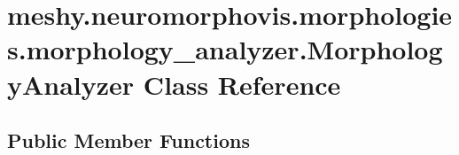 \hypertarget{classmeshy_1_1neuromorphovis_1_1morphologies_1_1morphology__analyzer_1_1MorphologyAnalyzer}{}\section{meshy.\+neuromorphovis.\+morphologies.\+morphology\+\_\+analyzer.\+Morphology\+Analyzer Class Reference}
\label{classmeshy_1_1neuromorphovis_1_1morphologies_1_1morphology__analyzer_1_1MorphologyAnalyzer}


 


\subsection*{Public Member Functions}
